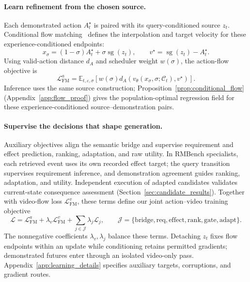 \paragraph{Learn refinement from the chosen source.}
Each demonstrated action $A_t^\star$ is paired with its query-conditioned source $z_t$.
Conditional flow matching~\citep{lipman2023flowmatching,liu2023rectifiedflow} defines the interpolation and target velocity for these experience-conditioned endpoints:
\begin{equation}
 x_\sigma=(1-\sigma)A_t^\star+\sigma\operatorname{sg}(z_t),\qquad
 v^\star=\operatorname{sg}(z_t)-A_t^\star.
 \label{eq:flow}
\end{equation}
Using valid-action distance $d_A$ and scheduler weight $w(\sigma)$, the action-flow objective is
\begin{equation}
 \mathcal L_{\mathrm{FM}}^a=\mathbb E_{t,\varepsilon,\sigma}
 \left[w(\sigma)d_A\!\left(v_\theta(x_\sigma,\sigma;\mathcal C_t),v^\star\right)\right].
 \label{eq:action_fm}
\end{equation}
Inference uses the same source construction; Proposition~\ref{prop:conditional_flow} (Appendix~\ref{app:flow_proof}) gives the population-optimal regression field for these experience-conditioned source--demonstration pairs.

\paragraph{Supervise the decisions that shape generation.}
Auxiliary objectives align the semantic bridge and supervise requirement and effect prediction, ranking, adaptation, and raw utility.
In RMBench specialists, each retrieved event uses its own recorded effect target; the query transition supervises requirement inference, and demonstration agreement guides ranking, adaptation, and utility.
Independent execution of adapted candidates validates current-state consequence assessment (Section~\ref{sec:candidate_results}).
Together with video-flow loss $\mathcal L_{\mathrm{FM}}^v$, these terms define our joint action--video training objective
\begin{equation}
 \mathcal L=\mathcal L_{\mathrm{FM}}^a+\lambda_v\mathcal L_{\mathrm{FM}}^v+
 \sum_{j\in\mathcal J}\lambda_j\mathcal L_j,\qquad
 \mathcal J=\{\mathrm{bridge},\mathrm{req},\mathrm{effect},\mathrm{rank},\mathrm{gate},\mathrm{adapt}\}.
 \label{eq:loss}
\end{equation}
The nonnegative coefficients $\lambda_v,\lambda_j$ balance these terms. Detaching $z_t$ fixes flow endpoints within an update while conditioning retains permitted gradients; demonstrated futures enter through an isolated video-only pass.
Appendix~\ref{app:learning_details} specifies auxiliary targets, corruptions, and gradient routes.


